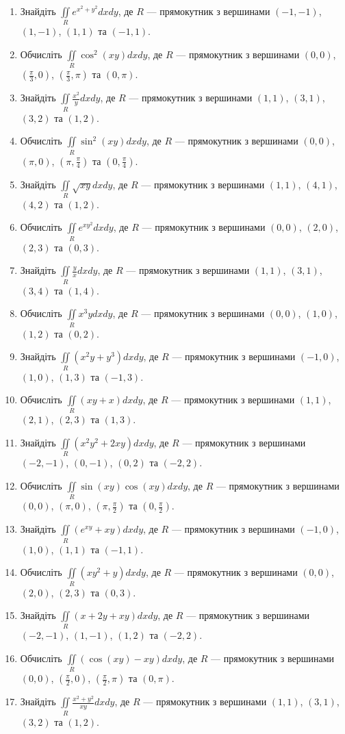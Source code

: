 \begin{enumerate}
\begin{enumerate}[label*=\arabic*.]
\item     Знайдіть $\iint\limits_{R} e^{x^2 + y^2}  dx  dy$, де $R$ --- прямокутник з вершинами $(-1, -1)$, $(1, -1)$, $(1, 1)$ та $(-1, 1)$.
\item     Обчисліть $\iint\limits_{R} \cos^2(xy)  dx  dy$, де $R$ --- прямокутник з вершинами $(0, 0)$, $(\frac{\pi}{3}, 0)$, $(\frac{\pi}{3}, \pi)$ та $(0, \pi)$.
\item     Знайдіть $\iint\limits_{R} \frac{x^2}{y}  dx  dy$, де $R$ --- прямокутник з вершинами $(1, 1)$, $(3, 1)$, $(3, 2)$ та $(1, 2)$.
\item     Обчисліть $\iint\limits_{R} \sin^2(xy)  dx  dy$, де $R$ --- прямокутник з вершинами $(0, 0)$, $(\pi, 0)$, $(\pi, \frac{\pi}{4})$ та $(0, \frac{\pi}{4})$.
\item     Знайдіть $\iint\limits_{R} \sqrt{xy}  dx  dy$, де $R$ --- прямокутник з вершинами $(1, 1)$, $(4, 1)$, $(4, 2)$ та $(1, 2)$.
\item     Обчисліть $\iint\limits_{R} e^{xy^2}  dx  dy$, де $R$ --- прямокутник з вершинами $(0, 0)$, $(2, 0)$, $(2, 3)$ та $(0, 3)$.
\item     Знайдіть $\iint\limits_{R} \frac{y}{x}  dx  dy$, де $R$ --- прямокутник з вершинами $(1, 1)$, $(3, 1)$, $(3, 4)$ та $(1, 4)$.
\item     Обчисліть $\iint\limits_{R} x^3y  dx  dy$, де $R$ --- прямокутник з вершинами $(0, 0)$, $(1, 0)$, $(1, 2)$ та $(0, 2)$.
\item     Знайдіть $\iint\limits_{R} (x^2y + y^3)  dx  dy$, де $R$ --- прямокутник з вершинами $(-1, 0)$, $(1, 0)$, $(1, 3)$ та $(-1, 3)$.
\item     Обчисліть $\iint\limits_{R} (xy + x)  dx  dy$, де $R$ --- прямокутник з вершинами $(1, 1)$, $(2, 1)$, $(2, 3)$ та $(1, 3)$.
\item     Знайдіть $\iint\limits_{R} (x^2y^2 + 2xy)  dx  dy$, де $R$ --- прямокутник з вершинами $(-2, -1)$, $(0, -1)$, $(0, 2)$ та $(-2, 2)$.
\item     Обчисліть $\iint\limits_{R} \sin(xy) \cos(xy)  dx  dy$, де $R$ --- прямокутник з вершинами $(0, 0)$, $(\pi, 0)$, $(\pi, \frac{\pi}{2})$ та $(0, \frac{\pi}{2})$.
\item     Знайдіть $\iint\limits_{R} \left(e^{xy} + xy\right)  dx  dy$, де $R$ --- прямокутник з вершинами $(-1, 0)$, $(1, 0)$, $(1, 1)$ та $(-1, 1)$.
\item     Обчисліть $\iint\limits_{R} (xy^2 + y)  dx  dy$, де $R$ --- прямокутник з вершинами $(0, 0)$, $(2, 0)$, $(2, 3)$ та $(0, 3)$.
\item     Знайдіть $\iint\limits_{R} (x + 2y + xy)  dx  dy$, де $R$ --- прямокутник з вершинами $(-2, -1)$, $(1, -1)$, $(1, 2)$ та $(-2, 2)$.
\item     Обчисліть $\iint\limits_{R}\left( \cos(xy) - xy\right)  dx  dy$, де $R$ --- прямокутник з вершинами $(0, 0)$, $(\frac{\pi}{2}, 0)$, $(\frac{\pi}{2}, \pi)$ та $(0, \pi)$.
\item     Знайдіть $\iint\limits_{R} \frac{x^2 + y^2}{xy}  dx  dy$, де $R$ --- прямокутник з вершинами $(1, 1)$, $(3, 1)$, $(3, 2)$ та $(1, 2)$.
\end{enumerate}
\end{enumerate}
